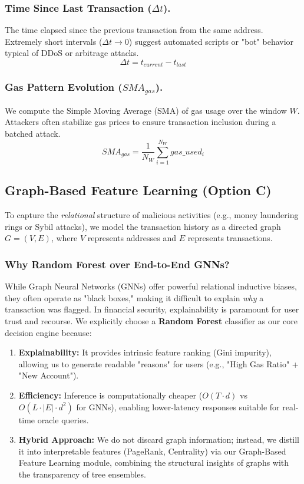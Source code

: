 \subsubsection{Time Since Last Transaction ($\Delta t$).}
The time elapsed since the previous transaction from the same address. Extremely short intervals ($\Delta t \to 0$) suggest automated scripts or "bot" behavior typical of DDoS or arbitrage attacks.
\begin{equation}
    \Delta t = t_{current} - t_{last}
\end{equation}

\subsubsection{Gas Pattern Evolution ($SMA_{gas}$).}
We compute the Simple Moving Average (SMA) of gas usage over the window $W$. Attackers often stabilize gas prices to ensure transaction inclusion during a batched attack.
\begin{equation}
    SMA_{gas} = \frac{1}{N_W} \sum_{i=1}^{N_W} gas\_used_i
\end{equation}

\subsection{Graph-Based Feature Learning (Option C)}
To capture the \textit{relational} structure of malicious activities (e.g., money laundering rings or Sybil attacks), we model the transaction history as a directed graph $G = (V, E)$, where $V$ represents addresses and $E$ represents transactions.

\subsubsection{Why Random Forest over End-to-End GNNs?}
While Graph Neural Networks (GNNs) offer powerful relational inductive biases, they often operate as "black boxes," making it difficult to explain \textit{why} a transaction was flagged. In financial security, explainability is paramount for user trust and recourse. We explicitly choose a \textbf{Random Forest} classifier as our core decision engine because:
\begin{enumerate}
    \item \textbf{Explainability:} It provides intrinsic feature ranking (Gini impurity), allowing us to generate readable "reasons" for users (e.g., "High Gas Ratio" + "New Account").
    \item \textbf{Efficiency:} Inference is computationally cheaper ($O(T \cdot d)$ vs $O(L \cdot |E| \cdot d^2)$ for GNNs), enabling lower-latency responses suitable for real-time oracle queries.
    \item \textbf{Hybrid Approach:} We do not discard graph information; instead, we distill it into interpretable features (PageRank, Centrality) via our Graph-Based Feature Learning module, combining the structural insights of graphs with the transparency of tree ensembles.
\end{enumerate}

